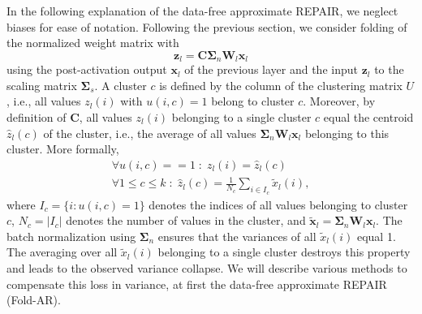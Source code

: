 \documentclass{article}
\begin{document}
{In the following explanation of the data-free approximate REPAIR, we neglect biases for ease of notation. Following the previous section, we consider folding of the normalized weight matrix with
\[
    \mathbf{z}_l = \mathbf{C} \mathbf{\Sigma}_n \mathbf{W}_l \mathbf{x}_l
\]
using the post-activation output $\mathbf{x}_l$ of the previous layer and the input $\mathbf{z}_l$ to the scaling matrix $\mathbf{\Sigma}_s$. A cluster $c$ is defined by the column of the clustering matrix $U$, i.e., all values $z_l(i)$ with $u(i,c) = 1$ belong to cluster $c$. Moreover, by definition of $\mathbf{C}$, all values $z_l(i)$ belonging to a single cluster $c$ equal  the centroid $\hat{z}_l(c)$ of the cluster, i.e., the average of all values $\mathbf{\Sigma}_n \mathbf{W}_l \mathbf{x}_l$ belonging to this cluster. More formally,  
\begin{align*}
    \forall u(i,c) == 1 \; : \; z_l(i) = \hat{z}_l(c) \\ 
    \forall 1 \leq c \leq k \; : \; \hat{z}_l(c) = \frac{1}{N_c} \sum_{i \in I_c} \tilde{x}_l(i),
\end{align*}
where $I_c = \{ i : u(i,c) = 1 \}$ denotes the indices of all values belonging to cluster $c$, $N_c = |I_c|$ denotes the number of values in the cluster, and $\mathbf{\tilde{x}}_l = \mathbf{\Sigma}_n \mathbf{W}_l \mathbf{x}_l$. The batch normalization using $\mathbf{\Sigma}_n$ ensures that the variances of all $\tilde{x}_l(i)$ equal 1. The averaging over all $\tilde{x}_l(i)$ belonging to a single cluster destroys this property and leads to the observed variance collapse. We will describe various methods to compensate this loss in variance, at first the data-free approximate REPAIR (Fold-AR). 


}
\end{document}
